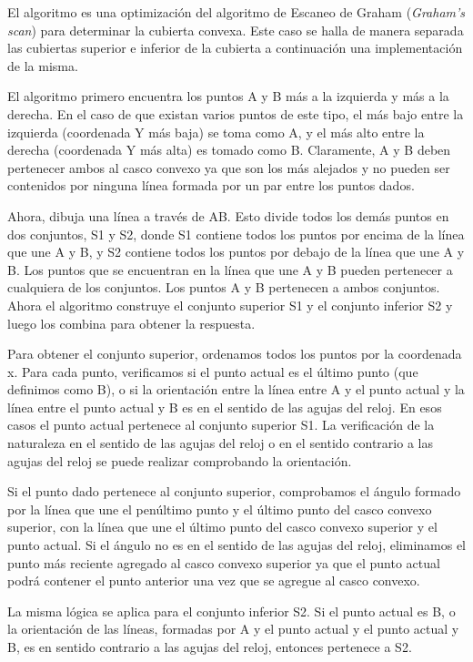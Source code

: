 El algoritmo  es una optimización del algoritmo de Escaneo de Graham (\emph{Graham's scan}) para determinar la cubierta convexa. Este caso se halla de manera separada las cubiertas superior e inferior de la cubierta a continuación una implementación de la misma.

El algoritmo primero encuentra los puntos A y B más a la izquierda y más a la derecha. En el caso de que existan varios puntos de este tipo, el más bajo entre la izquierda (coordenada Y más baja) se toma como A, y el más alto entre la derecha (coordenada Y más alta) es tomado como B. Claramente, A y B deben pertenecer ambos al casco convexo ya que son los más alejados y no pueden ser contenidos por ninguna línea formada por un par entre los puntos dados.

Ahora, dibuja una línea a través de AB. Esto divide todos los demás puntos en dos conjuntos, S1 y S2, donde S1 contiene todos los puntos por encima de la línea que une A y B, y S2 contiene todos los puntos por debajo de la línea que une A y B. Los puntos que se encuentran en la línea que une A y B pueden pertenecer a cualquiera de los conjuntos. Los puntos A y B pertenecen a ambos conjuntos. Ahora el algoritmo construye el conjunto superior S1 y el conjunto inferior S2 y luego los combina para obtener la respuesta.

Para obtener el conjunto superior, ordenamos todos los puntos por la coordenada x. Para cada punto, verificamos si el punto actual es el último punto (que definimos como B), o si la orientación entre la línea entre A y el punto actual y la línea entre el punto actual y B es en el sentido de las agujas del reloj. En esos casos el punto actual pertenece al conjunto superior S1. La verificación de la naturaleza en el sentido de las agujas del reloj o en el sentido contrario a las agujas del reloj se puede realizar comprobando la orientación.

Si el punto dado pertenece al conjunto superior, comprobamos el ángulo formado por la línea que une el penúltimo punto y el último punto del casco convexo superior, con la línea que une el último punto del casco convexo superior y el punto actual. Si el ángulo no es en el sentido de las agujas del reloj, eliminamos el punto más reciente agregado al casco convexo superior ya que el punto actual podrá contener el punto anterior una vez que se agregue al casco convexo.

La misma lógica se aplica para el conjunto inferior S2. Si el punto actual es B, o la orientación de las líneas, formadas por A y el punto actual y el punto actual y B, es en sentido contrario a las agujas del reloj, entonces pertenece a S2.

